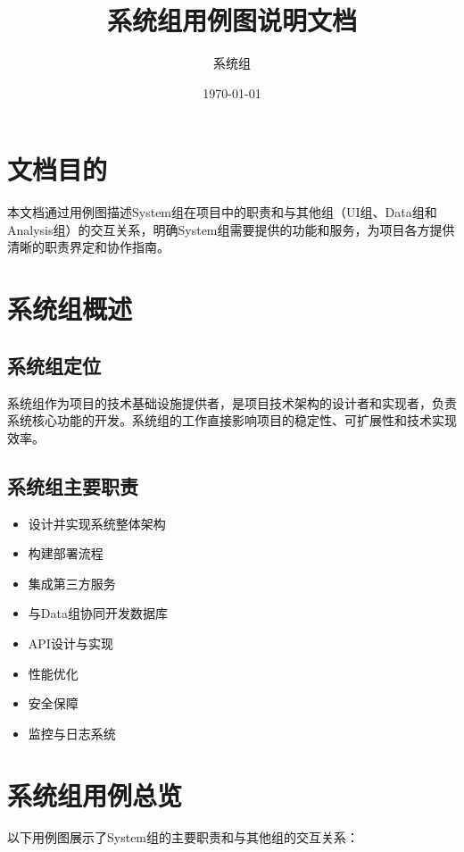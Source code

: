 \documentclass[a4paper,12pt]{article}
\title{系统组用例图说明文档}
\author{系统组}
\date{\today}
\begin{document}
\maketitle
\tableofcontents
\newpage

\section{文档目的}

本文档通过用例图描述System组在项目中的职责和与其他组（UI组、Data组和Analysis组）的交互关系，明确System组需要提供的功能和服务，为项目各方提供清晰的职责界定和协作指南。

\section{系统组概述}

\subsection{系统组定位}

系统组作为项目的技术基础设施提供者，是项目技术架构的设计者和实现者，负责系统核心功能的开发。系统组的工作直接影响项目的稳定性、可扩展性和技术实现效率。

\subsection{系统组主要职责}

\begin{itemize}
  \item 设计并实现系统整体架构
  \item 构建部署流程
  \item 集成第三方服务
  \item 与Data组协同开发数据库
  \item API设计与实现
  \item 性能优化
  \item 安全保障
  \item 监控与日志系统
\end{itemize}

\section{系统组用例总览}

以下用例图展示了System组的主要职责和与其他组的交互关系：
\end{document}
